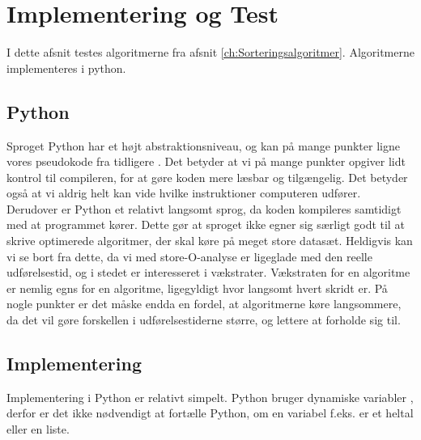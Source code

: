 \chapter{Implementering og Test}
\label{ch:Implementering og test af Algoritmerne}

I dette afsnit testes algoritmerne fra afsnit \ref{ch:Sorteringsalgoritmer}. Algoritmerne implementeres i python.

\section{Python}
\label{sec:Python}

Sproget Python har et højt abstraktionsniveau, og kan på mange punkter ligne vores pseudokode fra tidligere \cite[s. 68]{aogd}. Det betyder at vi på mange punkter opgiver lidt kontrol til compileren, for at gøre koden mere læsbar og tilgængelig. Det betyder også at vi aldrig helt kan vide hvilke instruktioner computeren udfører. Derudover er Python et relativt langsomt sprog, da koden kompileres samtidigt med at programmet kører. Dette gør at sproget ikke egner sig særligt godt til at skrive optimerede algoritmer, der skal køre på meget store datasæt. Heldigvis kan vi se bort fra dette, da vi med store-O-analyse er ligeglade med den reelle udførelsestid, og i stedet er interesseret i vækstrater. Vækstraten for en algoritme er nemlig egns for en algoritme, ligegyldigt hvor langsomt hvert skridt er. På nogle punkter er det måske endda en fordel, at algoritmerne køre langsommere, da det vil gøre forskellen i udførelsestiderne større, og lettere at forholde sig til. 


\section{Implementering}
\label{sec:Implementering}

Implementering i Python er relativt simpelt. Python bruger dynamiske variabler \cite{what-is-python}, derfor er det ikke nødvendigt at fortælle Python, om en variabel f.eks. er et heltal eller en liste. \red{[kode??]}


